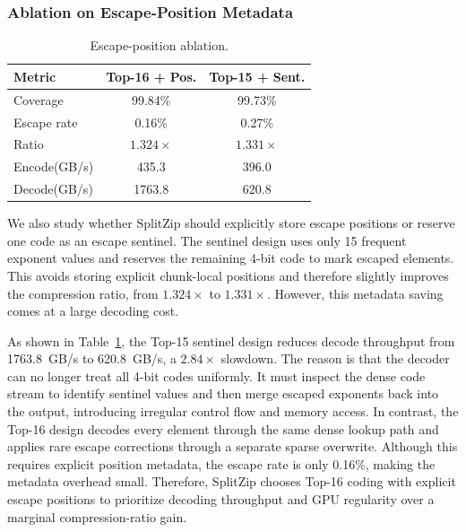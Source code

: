 \subsubsection{Ablation on Escape-Position Metadata}
\label{sec:ablation_escape_position}

\begin{table}
    \vspace{-1.4em}
    \centering
    \caption{Escape-position ablation.}

    \label{tab:ablation_escape_position}
    \scriptsize
    \setlength{\tabcolsep}{6pt}
    \renewcommand{\arraystretch}{1.08}
    \begin{tabular}{lcc}
        \toprule
        \textbf{Metric} & \textbf{Top-16 + Pos.} & \textbf{Top-15 + Sent.} \\
        \midrule
        Coverage & 99.84\% & 99.73\% \\
        Escape rate & 0.16\% & 0.27\% \\
        Ratio & $1.324\times$ & $1.331\times$ \\
        Encode(GB/s) & 435.3  & 396.0  \\
        Decode(GB/s) & 1763.8  & 620.8  \\
        \bottomrule
    \end{tabular}
    \vspace{-1.4em}
\end{table}

We also study whether SplitZip should explicitly store escape positions or reserve one code as an escape sentinel.
The sentinel design uses only 15 frequent exponent values and reserves the remaining 4-bit code to mark escaped elements.
This avoids storing explicit chunk-local positions and therefore slightly improves the compression ratio, from $1.324\times$ to $1.331\times$.
However, this metadata saving comes at a large decoding cost.

As shown in Table~\ref{tab:ablation_escape_position}, the Top-15 sentinel design reduces decode throughput from 1763.8~GB/s to 620.8~GB/s, a $2.84\times$ slowdown.
The reason is that the decoder can no longer treat all 4-bit codes uniformly.
It must inspect the dense code stream to identify sentinel values and then merge escaped exponents back into the output, introducing irregular control flow and memory access.
In contrast, the Top-16 design decodes every element through the same dense lookup path and applies rare escape corrections through a separate sparse overwrite.
Although this requires explicit position metadata, the escape rate is only 0.16\%, making the metadata overhead small.
Therefore, SplitZip chooses Top-16 coding with explicit escape positions to prioritize decoding throughput and GPU regularity over a marginal compression-ratio gain.
